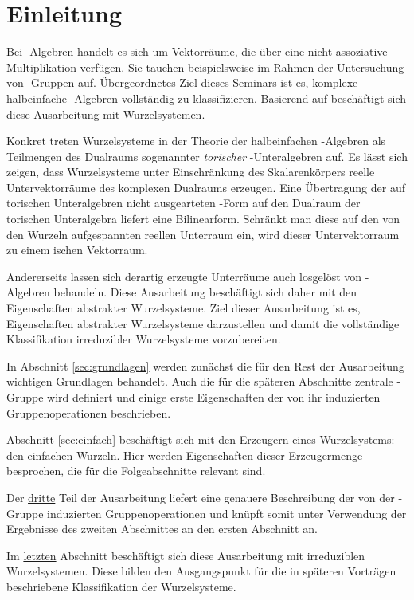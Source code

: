 \section*{Einleitung}

Bei \lie\hyp{}Algebren handelt es sich um Vektorräume, die über eine nicht assoziative Multiplikation verfügen.
Sie tauchen beispielsweise im Rahmen der Untersuchung von \lie\hyp{}Gruppen auf.
Übergeordnetes Ziel dieses Seminars ist es, komplexe halbeinfache \lie\hyp{}Algebren vollständig zu klassifizieren.
Basierend auf \cite[S.49-55]{humphreys1972introduction} beschäftigt sich diese Ausarbeitung mit Wurzelsystemen.

Konkret treten Wurzelsysteme in der Theorie der halbeinfachen \lie\hyp{}Algebren als Teilmengen des Dualraums sogenannter \emph{torischer} \lie\hyp{}Unteralgebren auf.
Es lässt sich zeigen, dass Wurzelsysteme unter Einschränkung des Skalarenkörpers reelle Untervektorräume des komplexen Dualraums erzeugen.
Eine Übertragung der auf torischen Unteralgebren nicht ausgearteten \killing\hyp{}Form auf den Dualraum der torischen Unteralgebra liefert eine Bilinearform.
Schränkt man diese auf den von den Wurzeln aufgespannten reellen Unterraum ein, wird dieser Untervektorraum zu einem \euklid ischen Vektorraum.

Andererseits lassen sich derartig erzeugte Unterräume auch losgelöst von \lie\hyp{}Algebren behandeln.
Diese Ausarbeitung beschäftigt sich daher mit den Eigenschaften abstrakter Wurzelsysteme.
Ziel dieser Ausarbeitung ist es, Eigenschaften abstrakter Wurzelsysteme darzustellen und damit die vollständige Klassifikation irreduzibler Wurzelsysteme vorzubereiten.

In Abschnitt \ref{sec:grundlagen} werden zunächst die für den Rest der Ausarbeitung wichtigen Grundlagen behandelt.
Auch die für die späteren Abschnitte zentrale \weyl\hyp{}Gruppe wird definiert und einige erste Eigenschaften der von ihr induzierten Gruppenoperationen beschrieben.

Abschnitt \ref{sec:einfach} beschäftigt sich mit den Erzeugern eines Wurzelsystems: den einfachen Wurzeln. 
Hier werden Eigenschaften dieser Erzeugermenge besprochen, die für die Folgeabschnitte relevant sind.

Der \hyperref[sec:weylgroup]{dritte} Teil der Ausarbeitung liefert eine genauere Beschreibung der von der \weyl\hyp{}Gruppe induzierten Gruppenoperationen und knüpft somit unter Verwendung der Ergebnisse des zweiten Abschnittes an den ersten Abschnitt an.

Im \hyperref[sec:irreduc]{letzten} Abschnitt beschäftigt sich diese Ausarbeitung mit irreduziblen Wurzelsystemen. 
Diese bilden den Ausgangspunkt für die in späteren Vorträgen beschriebene Klassifikation der Wurzelsysteme.
